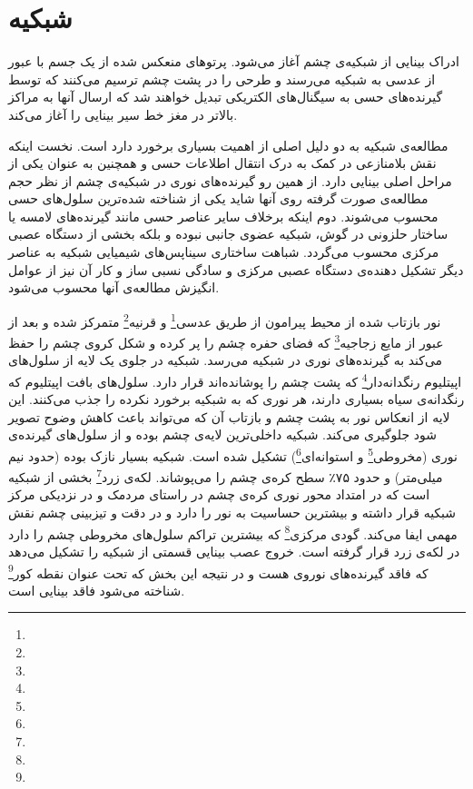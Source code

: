 \section{شبکیه}
ادراک بینایی از شبکیه‌ی چشم آغاز می‌شود. پرتوهای منعکس شده از یک جسم با عبور از عدسی به شبکیه می‌رسند و طرحی را در پشت چشم ترسیم می‌کنند که توسط گیرنده‌های حسی به سیگنال‌های الکتریکی تبدیل خواهند شد که ارسال آنها به مراکز بالاتر در مغز خط سیر بینایی را آغاز می‌کند. 

مطالعه‌ی شبکیه به دو دلیل اصلی از اهمیت بسیاری برخورد دارد است. نخست اینکه نقش بلامنازعی در کمک به درک انتقال اطلاعات حسی و همچنین به عنوان یکی از مراحل اصلی بینایی دارد. از همین رو گیرنده‌های نوری در شبکیه‌ی چشم از نظر حجم مطالعه‌ی صورت گرفته روی آنها شاید یکی از شناخته شده‌ترین سلول‌های حسی محسوب می‌شوند. دوم اینکه برخلاف سایر عناصر حسی مانند گیرنده‌های لامسه یا ساختار حلزونی در گوش، شبکیه عضوی جانبی نبوده و بلکه بخشی از دستگاه عصبی مرکزی محسوب می‌گردد. شباهت ساختاری سیناپس‌های شیمیایی شبکیه به عناصر دیگر تشکیل دهنده‌ی دستگاه عصبی مرکزی و سادگی نسبی ساز و کار آن نیز از عوامل انگیزش مطالعه‌ی آنها محسوب می‌شود. 

نور بازتاب شده از محیط پیرامون از طریق عدسی\footnote{} و قرنیه\footnote{} متمرکز شده و بعد از عبور از مایع زجاجیه\footnote{} که فضای حفره چشم را پر کرده و شکل کروی چشم را حفظ می‌کند به گیرنده‌های نوری در شبکیه می‌رسد. شبکیه در جلوی یک لایه از سلول‌های اپیتلیوم رنگدانه‌دار\footnote{} که پشت چشم را پوشانده‌اند قرار دارد. سلول‌های بافت اپیتلیوم که رنگدانه‌ی سیاه بسیاری دارند، هر نوری که به شبکیه برخورد نکرده را جذب می‌کنند. این لایه از انعکاس نور به پشت چشم و بازتاب آن که می‌تواند باعث کاهش وضوح تصویر شود جلوگیری می‌کند. شبکیه داخلی‌ترین لایه‌ی چشم بوده و از سلول‌های گیرنده‌ی نوری (مخروطی\footnote{} و استوانه‌ای\footnote{}) تشکیل شده است. شبکیه بسیار نازک بوده (حدود نیم میلی‌متر) و حدود ۷۵٪ سطح کره‌ی چشم را می‌پوشاند. لکه‌ی زرد\footnote{} بخشی از شبکیه است که در امتداد محور نوری کره‌ی چشم در راستای مردمک و در نزدیکی مرکز شبکیه قرار داشته و بیشترین حساسیت به نور را دارد و در دقت و تیزبینی چشم نقش مهمی ایفا می‌کند. گودی مرکزی\footnote{} که بیشترین تراکم سلول‌های مخروطی چشم را دارد در لکه‌ی زرد قرار گرفته است. خروج عصب بینایی قسمتی از شبکیه را تشکیل می‌دهد که فاقد گیرنده‌های نوروی هست و در نتیجه این بخش که تحت عنوان نقطه کور\footnote{} شناخته می‌شود فاقد بینایی است.

